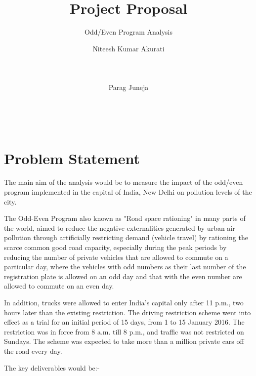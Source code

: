 \documentclass{acm_proc_article-sp}
\begin{document}
\title{Project Proposal}
\subtitle{Odd/Even Program Analysis}

\author{
\alignauthor
Niteesh Kumar Akurati\\
       \\
       \\
       \\
\alignauthor
Parag Juneja\\
       \\
       \\
       \\
}

\maketitle

\section{Problem Statement}
The main aim of the analysis would be to measure the impact of the odd/even program implemented in the capital of India, New Delhi on pollution levels of the city.

The Odd-Even Program also known as "Road space rationing" in many parts of the world, aimed to reduce the negative externalities generated by urban air pollution through artificially restricting demand (vehicle travel) by rationing the scarce common good road capacity, especially during the peak periods by reducing the number of private vehicles that are allowed to commute on a particular day, where the vehicles with odd numbers as their last number of the registration plate is allowed on an odd day and that with the even number are allowed to commute on an even day.

In addition, trucks were allowed to enter India's capital only after 11 p.m., two hours later than the existing restriction. The driving restriction scheme went into effect as a trial for an initial period of 15 days, from 1 to 15 January 2016. The restriction was in force from 8 a.m. till 8 p.m., and traffic was not restricted on Sundays. The scheme was expected to take more than a million private cars off the 
road every day.\cite{RoadSpaceRationing}




The key deliverables would be:-
\end{document}
